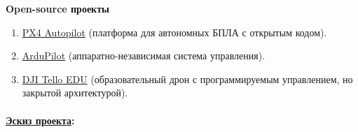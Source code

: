 \documentclass[a4paper,12pt]{article} %
\begin{document}
\textbf{Open-source проекты}
\begin{enumerate}
    \item \href{https://px4.io}{PX4 Autopilot} (платформа для автономных БПЛА с открытым кодом).
    \item \href{https://ardupilot.org}{ArduPilot} (аппаратно-независимая система управления).
    \item \href{https://www.dji.com/ru}{DJI Tello EDU} (образовательный дрон с программируемым управлением, но закрытой архитектурой).
\end{enumerate}

\paragraph{\underline{Эскиз проекта}:}\
\end{document}
